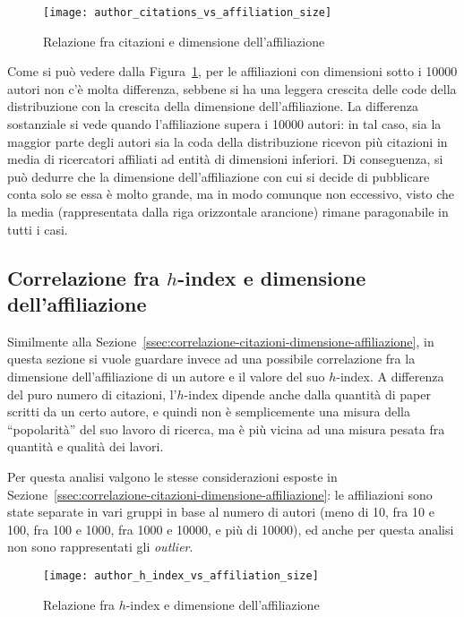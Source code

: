 \begin{figure}[tb]
  \texttt{[image: author\_citations\_vs\_affiliation\_size]}
  \caption{Relazione fra citazioni e dimensione dell'affiliazione}
  \label{fig:author-citations-vs-affiliation-size}
\end{figure}

Come si può vedere dalla Figura~\ref{fig:author-citations-vs-affiliation-size},
per le affiliazioni con dimensioni sotto i 10000 autori non c'è molta differenza,
sebbene si ha una leggera crescita delle code della distribuzione con la crescita
della dimensione dell'affiliazione.
La differenza sostanziale si vede quando l'affiliazione supera i 10000 autori:
in tal caso, sia la maggior parte degli autori sia la coda della distribuzione
ricevon più citazioni in media di ricercatori affiliati ad entità di dimensioni
inferiori.
Di conseguenza, si può dedurre che la dimensione dell'affiliazione con cui
si decide di pubblicare conta solo se essa è molto grande, ma in modo comunque
non eccessivo, visto che la media (rappresentata dalla riga orizzontale
arancione) rimane paragonabile in tutti i casi.

\subsection{Correlazione fra $h$-index e dimensione dell'affiliazione}
\label{ssec:correlazione-h-index-dimensione-affiliazione}

Similmente alla Sezione~\ref{ssec:correlazione-citazioni-dimensione-affiliazione},
in questa sezione si vuole guardare invece ad una possibile correlazione fra la
dimensione dell'affiliazione di un autore e il valore del suo $h$-index.
A differenza del puro numero di citazioni, l'$h$-index dipende anche dalla
quantità di paper scritti da un certo autore, e quindi non è semplicemente una
misura della ``popolarità'' del suo lavoro di ricerca, ma è più vicina ad una
misura pesata fra quantità e qualità dei lavori.

Per questa analisi valgono le stesse considerazioni esposte in
Sezione~\ref{ssec:correlazione-citazioni-dimensione-affiliazione}: le affiliazioni
sono state separate in vari gruppi in base al numero di autori (meno di 10, fra
10 e 100, fra 100 e 1000, fra 1000 e 10000, e più di 10000), ed anche per questa
analisi non sono rappresentati gli \textit{outlier}.

\begin{figure}[tb]
  \texttt{[image: author\_h\_index\_vs\_affiliation\_size]}
  \caption{Relazione fra $h$-index e dimensione dell'affiliazione}
  \label{fig:author-h-index-vs-affiliation-size}
\end{figure}

